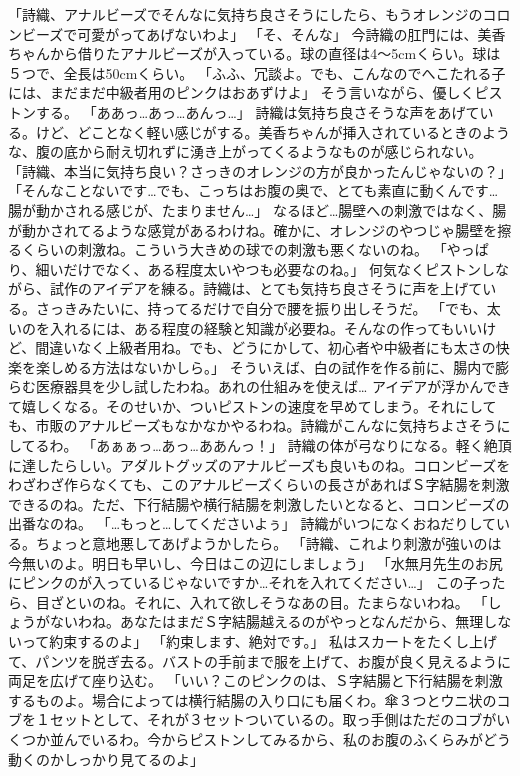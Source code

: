 「詩織、アナルビーズでそんなに気持ち良さそうにしたら、もうオレンジのコロンビーズで可愛がってあげないわよ」
「そ、そんな」
今詩織の肛門には、美香ちゃんから借りたアナルビーズが入っている。球の直径は4～5cmくらい。球は５つで、全長は50cmくらい。
「ふふ、冗談よ。でも、こんなのでへこたれる子には、まだまだ中級者用のピンクはおあずけよ」
そう言いながら、優しくピストンする。
「ああっ…あっ…あんっ…」
詩織は気持ち良さそうな声をあげている。けど、どことなく軽い感じがする。美香ちゃんが挿入されているときのような、腹の底から耐え切れずに湧き上がってくるようなものが感じられない。
「詩織、本当に気持ち良い？さっきのオレンジの方が良かったんじゃないの？」
「そんなことないです…でも、こっちはお腹の奥で、とても素直に動くんです…腸が動かされる感じが、たまりません…」
なるほど…腸壁への刺激ではなく、腸が動かされてるような感覚があるわけね。確かに、オレンジのやつじゃ腸壁を擦るくらいの刺激ね。こういう大きめの球での刺激も悪くないのね。
「やっぱり、細いだけでなく、ある程度太いやつも必要なのね。」
何気なくピストンしながら、試作のアイデアを練る。詩織は、とても気持ち良さそうに声を上げている。さっきみたいに、持ってるだけで自分で腰を振り出しそうだ。
「でも、太いのを入れるには、ある程度の経験と知識が必要ね。そんなの作ってもいいけど、間違いなく上級者用ね。でも、どうにかして、初心者や中級者にも太さの快楽を楽しめる方法はないかしら。」
そういえば、白の試作を作る前に、腸内で膨らむ医療器具を少し試したわね。あれの仕組みを使えば…
アイデアが浮かんできて嬉しくなる。そのせいか、ついピストンの速度を早めてしまう。それにしても、市販のアナルビーズもなかなかやるわね。詩織がこんなに気持ちよさそうにしてるわ。
「あぁぁっ…あっ…ああんっ！」
詩織の体が弓なりになる。軽く絶頂に達したらしい。アダルトグッズのアナルビーズも良いものね。コロンビーズをわざわざ作らなくても、このアナルビーズくらいの長さがあればＳ字結腸を刺激できるのね。ただ、下行結腸や横行結腸を刺激したいとなると、コロンビーズの出番なのね。
「…もっと…してくださいよぅ」
詩織がいつになくおねだりしている。ちょっと意地悪してあげようかしたら。
「詩織、これより刺激が強いのは今無いのよ。明日も早いし、今日はこの辺にしましょう」
「水無月先生のお尻にピンクのが入っているじゃないですか…それを入れてください…」
この子ったら、目ざといのね。それに、入れて欲しそうなあの目。たまらないわね。
「しょうがないわね。あなたはまだＳ字結腸越えるのがやっとなんだから、無理しないって約束するのよ」
「約束します、絶対です。」
私はスカートをたくし上げて、パンツを脱ぎ去る。バストの手前まで服を上げて、お腹が良く見えるように両足を広げて座り込む。
「いい？このピンクのは、Ｓ字結腸と下行結腸を刺激するものよ。場合によっては横行結腸の入り口にも届くわ。傘３つとウニ状のコブを１セットとして、それが３セットついているの。取っ手側はただのコブがいくつか並んでいるわ。今からピストンしてみるから、私のお腹のふくらみがどう動くのかしっかり見てるのよ」
